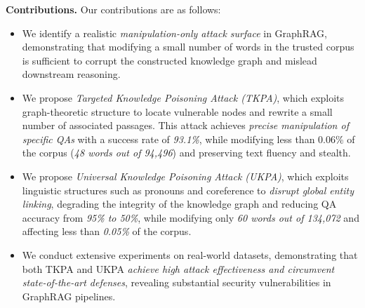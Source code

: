 \documentclass[letterpaper]{article} %
\begin{document}
\textbf{Contributions.} Our contributions are as follows:
\begin{itemize}
\item We identify a realistic \emph{manipulation-only attack surface} in GraphRAG, demonstrating that modifying a small number of words in the trusted corpus is sufficient to corrupt the constructed knowledge graph and mislead downstream reasoning.
\item We propose \emph{Targeted Knowledge Poisoning Attack (TKPA)}, which exploits graph-theoretic structure to locate vulnerable nodes and rewrite a small number of associated passages. This attack achieves \emph{precise manipulation of specific QAs} with a success rate of \emph{93.1\%}, while modifying less than 0.06\% of the corpus (\emph{48 words out of 94,496}) and preserving text fluency and stealth.
\item We propose \emph{Universal Knowledge Poisoning Attack (UKPA)}, which exploits linguistic structures such as pronouns and coreference to \emph{disrupt global entity linking}, degrading the integrity of the knowledge graph and reducing QA accuracy from \emph{95\% to 50\%}, while modifying only \emph{60 words out of 134,072} and affecting less than \emph{0.05\%} of the corpus.
\item We conduct extensive experiments on real-world datasets, demonstrating that both TKPA and UKPA \emph{achieve high attack effectiveness and circumvent state-of-the-art defenses}, revealing substantial security vulnerabilities in GraphRAG pipelines.
\end{itemize}









\end{document}
